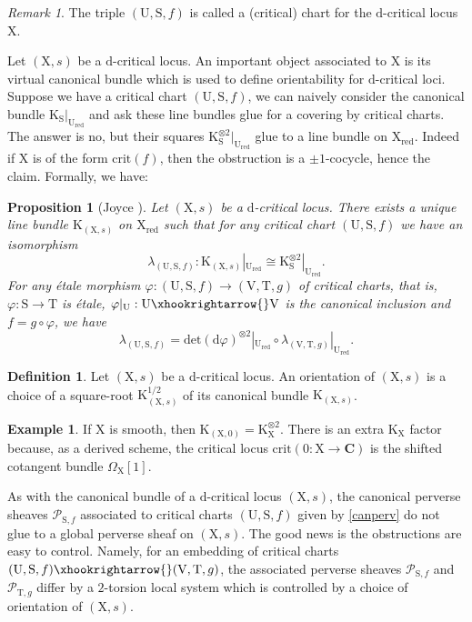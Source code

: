 \documentclass{article}
\theoremstyle{plain}
\newtheorem{proposition}[theorem]{Proposition}
\theoremstyle{definition}
\newtheorem{definition}[theorem]{Definition}
\newtheorem{example}[theorem]{Example}
\theoremstyle{remark}
\newtheorem{remark}[theorem]{Remark}
\newcommand{\mr}{\mathrm}
\newcommand{\C}{\mathbf C}
\newcommand{\3}{\vspace{3mm}}
\newcommand{\2}{\vspace{2mm}}
\newcommand{\1}{\vspace{1mm}}
\begin{document}
\2
\begin{remark}
The triple $(\mr{U},\mr{S},f)$ is called a (critical) chart for the $\mr{d}$-critical locus $\mr{X}$.
\end{remark}
Let $(\mr{X},s)$ be a $\mr{d}$-critical locus. An important object associated to $\mr{X}$ is its virtual canonical bundle which is used to define orientability for $\mr{d}$-critical loci.\\
Suppose we have a critical chart $(\mr{U},\mr{S},f)$, we can  naively consider the canonical bundle $\mr{K}_\mr{S}|_{\mr{U}_\mr{red}}$ and ask these line bundles glue for a covering by critical charts. The answer is no, but their squares $\mr{K}_\mr{S}^{\otimes 2}|_{\mr{U}_\mr{red}}$ glue to a line bundle on $\mr{X}_\mr{red}$. Indeed if $\mr{X}$ is of the form $\mr{crit}(f)$, then the obstruction is a $\pm1$-cocycle, hence the claim. Formally, we have:
\2
\begin{proposition}[Joyce \cite{MR3399099}]
 Let $(\mr{X},s)$ be a $\mr{d}$-critical locus. There exists a unique line bundle $\mr{K}_{(\mr{X},s)}$ on $\mr{X}_\mr{red}$ such that for any critical chart $(\mr{U},\mr{S},f)$ we have an isomorphism $$\lambda_{(\mr{U},\mr{S},f)}:\mr{K}_{(\mr{X},s)}|_{\mr{U}_\mr{red}} \cong \mr{K}_{\mr{S}}^{\otimes 2}|_{\mr{U}_\mr{red}}.$$ For any étale morphism $\varphi : (\mr{U},\mr{S},f) \to (\mr{V},\mr{T},g)$ of critical charts, that is, $\varphi : \mr{S} \to \mr{T}$ is étale, $\varphi|_{\mr{U}} : \mr{U} \xhookrightarrow{} \mr{V}$ is the canonical inclusion and $f = g\circ \varphi$, we have $$\lambda_{(\mr{U},\mr{S},f)} = \mr{det}(\mr{d}\varphi)^{\otimes 2}|_{\mr{U}_\mr{red}}\circ \lambda_{(\mr{V},\mr{T},g)}|_{\mr{U}_{\mr{red}}}.$$
\end{proposition}
\2
\begin{definition}
Let $(\mr{X},s)$ be a $\mr{d}$-critical locus. An orientation of $(\mr{X},s)$ is a choice of a square-root $\mr{K}_{(\mr{X},s)}^{1/2}$ of its canonical bundle $\mr{K}_{(\mr{X},s)}$.
\end{definition}
\2
\begin{example}
 If $\mr{X}$ is smooth, then $\mr{K}_{(\mr{X},0)} = \mr{K}_{\mr{X}}^{\otimes 2}$. There is an extra $\mr{K}_\mr{X}$ factor because, as a derived scheme, the critical locus $\mr{crit}(0:\mr{X} \to \C)$ is the shifted cotangent bundle $\Omega_\mr{X}[1]$.
\end{example}
As with the canonical bundle of a $\mr{d}$-critical locus $(\mr{X},s)$, the canonical perverse sheaves $\mathscr{P}_{\mr{S},f}$ associated to critical charts $(\mr{U,S},f)$ given by \eqref{canperv} do not glue to a global perverse sheaf on $(\mr{X},s)$. The good news is the obstructions are easy to control. Namely, for an embedding of critical charts $(\mr{U,S},f)\xhookrightarrow{} (\mr{V,T},g)$, the associated perverse sheaves $\mathscr{P}_{\mr{S},f}$ and $\mathscr{P}_{\mr{T},g}$ differ by a $2$-torsion local system which is controlled by a choice of orientation of $(\mr{X},s)$.
\end{document}
